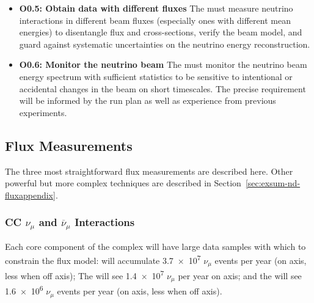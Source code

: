 \begin{itemize}
    \item{\bf O0.5: Obtain data with different fluxes} The  must measure neutrino interactions in different beam fluxes (especially ones with different mean energies) to disentangle flux and cross-sections, verify the beam model, and guard against systematic uncertainties on the neutrino energy reconstruction.
    
    \item{\bf O0.6: Monitor the neutrino beam} The  must monitor the neutrino beam energy spectrum with sufficient statistics to be sensitive to intentional or accidental changes in the beam on short timescales. The precise requirement will be informed by the run plan as well as experience from previous experiments. 
    
\end{itemize}

\subsection{Flux Measurements}

The three most straightforward flux measurements are described here. Other powerful but more complex techniques are described in Section~\ref{sec:exsum-nd-fluxappendix}.

\subsubsection{CC $\nu_{\mu}$ and $\overline{\nu}_{\mu}$ Interactions}
Each core component of the  complex will have large data samples with which to constrain the flux model:   will accumulate \num{3.7e7}  $\nu_{\mu}$ events per year (on axis, less when off axis);  The  will see \num{1.4e7}  $\nu_{\mu}$ per year on axis; and the  will see \num{1.6e6}  $\nu_{\mu}$ events per year (on axis, less when off axis). 



